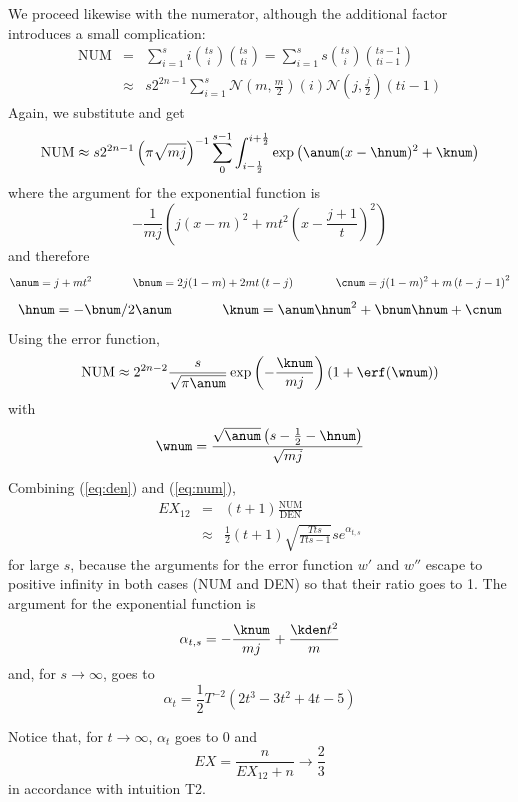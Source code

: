 \documentclass[phd,12pt,oneside]{ubcthesis}
\begin{document}
We proceed likewise with the numerator, although the additional factor
introduces a small complication:
  \begin{eqnarray*}
  \mbox{NUM}&=&\sum_{i=1}^{s}i\binom{ts}{i}\binom{ts}{ti}=\sum_{i=1}^{s}s\binom{ts}{i}\binom{ts-1}{ti-1}\\
&\approx&s2^{2n-1}\sum_{i=1}^{s}\mathcal{N}\left(m,\frac{m}{2}\right)(i)\mathcal{N}\left(j,\frac{j}{2}\right)(ti-1)
\end{eqnarray*}
Again, we substitute and get
\begin{equation}
  \label{eq:iuloogho}
  \mbox{NUM}\approx{}s2^{2n-1}\left(\pi\sqrt{mj}\right)^{-1}\sum_{0}^{s-1}\int_{i-\frac{1}{2}}^{i+\frac{1}{2}}\exp\left({\anum}(x-{\hnum})^{2}+{\knum}\right)
\end{equation}
where the argument for the exponential function is
\begin{equation}
  \label{eq:yaekituk}
  -\frac{1}{mj}\left(j(x-m)^{2}+mt^{2}\left(x-\frac{j+1}{t}\right)^{2}\right)
\end{equation}
and therefore
\begin{equation}
  \label{eq:eyeangie}
{\anum}=j+mt^{2}\hspace{.5in}
{\bnum}=2j(1-m)+2mt\left(t-j\right)\hspace{.5in}
{\cnum}=j(1-m)^{2}+m\left(t-j-1\right)^{2}
\end{equation}
\begin{equation}
  \label{eq:ohghaeni}
{\hnum}=-{\bnum}/2{\anum}\hspace{.5in}
{\knum}={\anum}{\hnum}^{2}+{\bnum}{\hnum}+{\cnum}
\end{equation}
Using the error function, 
\begin{equation}
  \label{eq:num}
  \mbox{NUM}\approx{}2^{2n-2}\frac{s}{\sqrt{\pi{}{\anum}}}\exp\left(-\frac{{\knum}}{mj}\right)\left(1+\erf({\wnum})\right)
\end{equation}
with
\begin{equation}
  \label{eq:nahngeil}
  {\wnum}=\frac{\sqrt{{\anum}}\left(s-\frac{1}{2}-{\hnum}\right)}{\sqrt{mj}}
\end{equation}

{\noindent}Combining ({\ref{eq:den}}) and ({\ref{eq:num}}),
\begin{eqnarray*}
  EX_{12}&=&(t+1)\frac{\mbox{NUM}}{\mbox{DEN}}\\
&\approx&\frac{1}{2}(t+1)\sqrt{\frac{{T}{}ts}{{T}{}ts-1}}se^{\alpha_{t,s}}
\end{eqnarray*}
for large $s$, because the arguments for the error function $w'$ and
$w''$ escape to positive infinity in both cases (NUM and DEN) so that
their ratio goes to 1. The argument for the exponential function is
\begin{equation}
  \label{eq:beefadao}
  \alpha_{t,s}=-\frac{{\knum}}{mj}+\frac{{\kden}t^{2}}{m}
\end{equation}
and, for $s\rightarrow\infty$, goes to
\begin{equation}
  \label{eq:chuhohng}
  \alpha_{t}=\frac{1}{2}{T}^{-2}(2t^{3}-3t^{2}+4t-5)
\end{equation}

{\noindent}Notice that, for $t\rightarrow\infty$, $\alpha_{t}$ goes to $0$ and
\begin{equation}
  \label{eq:oobeadoo}
  EX=\frac{n}{EX_{12}+n}\rightarrow\frac{2}{3}
\end{equation}
in accordance with intuition T2.
\end{document}
